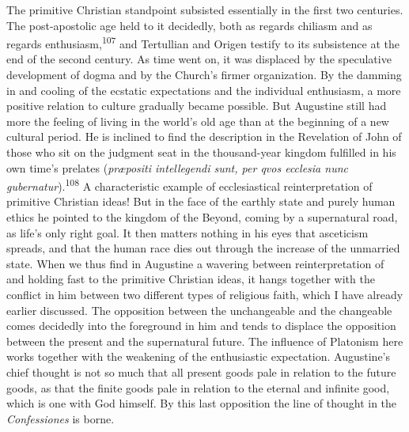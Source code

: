 \documentclass[12pt,a4paper]{book}
\newcommand{\opage}[1]{\marginnote{\footnotesize\textit{[#1]}}}
\begin{document}
The primitive Christian standpoint subsisted essentially in the first two centuries. The post-apostolic age
held to it decidedly, both as regards chiliasm and as regards enthusiasm,\textsuperscript{107} and
Tertullian and Origen testify to its subsistence at the end of the second century. As time went on, it was
displaced by the speculative development of dogma and by the Church's firmer organization. By the damming in
and cooling of the ecstatic expectations and the individual enthusiasm, a more positive relation to culture
gradually became possible. But Augustine still had more the feeling of living in the world's old age than at
the beginning of a new cultural period. He is inclined to find the description in the Revelation of John of
those who sit on the judgment seat in the thousand-year kingdom fulfilled in his own time's prelates
(\textit{præpositi intellegendi sunt, per qvos ecclesia nunc gubernatur}).\textsuperscript{108} A
characteristic example of ecclesiastical reinterpretation of primitive Christian ideas! But in the face of
the earthly state and purely human ethics he pointed to the kingdom of the Beyond, coming by a supernatural
road, as life's only right goal. It then matters nothing in his eyes that asceticism spreads, and that the
human race dies out through the increase of the unmarried state. When we thus find in Augustine a wavering
between reinterpretation of and holding fast to the primitive Christian ideas, it hangs together with the
conflict in him between two different types of religious faith, which I have already earlier discussed. The
opposition between the unchangeable and the changeable comes decidedly into the foreground in him and tends
to displace the opposition between the present and the supernatural future. The influence of Platonism here
works together with the weakening of the enthusiastic expectation. Augustine's chief thought is not so much
that all present goods pale in relation to the future goods, as that the finite goods pale in relation to the
eternal and infinite good, which is one with 
\opage{232}God himself. By this last opposition the line of thought in the
\emph{Confessiones} is borne.

\medskip
\end{document}
